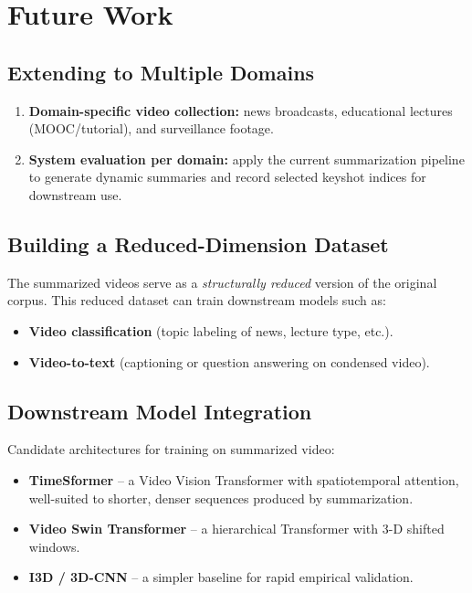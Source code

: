 \documentclass[12pt, a4paper]{report}
\begin{document}
\chapter{Future Work}

\section{Extending to Multiple Domains}

\begin{enumerate}
  \item \textbf{Domain-specific video collection:} news broadcasts, educational
        lectures (MOOC/tutorial), and surveillance footage.
  \item \textbf{System evaluation per domain:} apply the current summarization
        pipeline to generate dynamic summaries and record selected keyshot indices
        for downstream use.
\end{enumerate}

\section{Building a Reduced-Dimension Dataset}

The summarized videos serve as a \emph{structurally reduced} version of the original
corpus. This reduced dataset can train downstream models such as:
\begin{itemize}
  \item \textbf{Video classification} (topic labeling of news, lecture type, etc.).
  \item \textbf{Video-to-text} (captioning or question answering on condensed video).
\end{itemize}

\section{Downstream Model Integration}

Candidate architectures for training on summarized video:
\begin{itemize}
  \item \textbf{TimeSformer} -- a Video Vision Transformer with spatiotemporal
        attention, well-suited to shorter, denser sequences produced by summarization.
  \item \textbf{Video Swin Transformer} -- a hierarchical Transformer with 3-D
        shifted windows.
  \item \textbf{I3D / 3D-CNN} -- a simpler baseline for rapid empirical validation.
\end{itemize}
\end{document}
